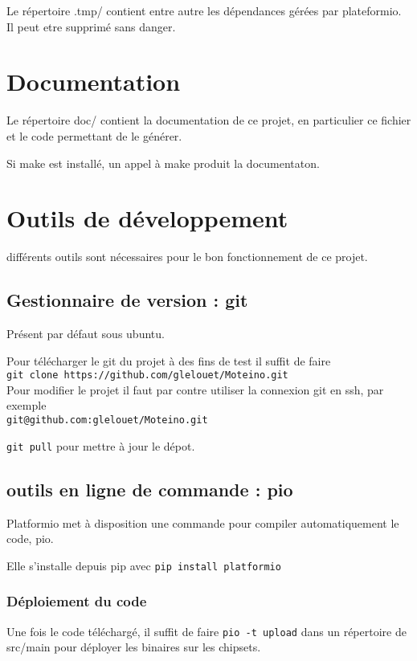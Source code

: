 \documentclass[a4paper]{report}
\begin{document}
Le répertoire .tmp/ contient entre autre les dépendances gérées par plateformio. Il peut etre supprimé sans danger.

\section{Documentation}

Le répertoire doc/ contient la documentation de ce projet, en particulier ce fichier et le code permettant de le générer.

Si make est installé, un appel à make produit la documentaton.

\section{Outils de développement}

différents outils sont nécessaires pour le bon fonctionnement de ce projet.

\subsection{Gestionnaire de version : git}

Présent par défaut sous ubuntu.

Pour télécharger le git du projet à des fins de test il suffit de faire\\
\verb+git clone https://github.com/glelouet/Moteino.git+\\

Pour modifier le projet il faut par contre utiliser la connexion git en ssh, par exemple\\
\verb+git@github.com:glelouet/Moteino.git+

\verb+git pull+ pour mettre à jour le dépot. 

\subsection{outils en ligne de commande : pio}

Platformio met à disposition une commande pour compiler automatiquement le code, pio.

Elle s'installe depuis pip avec \verb+pip install platformio+

\subsubsection{Déploiement du code}

Une fois le code téléchargé, il suffit de faire \verb+pio -t upload+ dans un répertoire de src/main pour déployer les binaires sur les chipsets.
\end{document}
